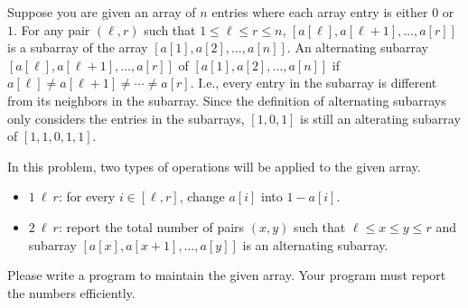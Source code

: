 Suppose you are given an array of $n$ entries
where each array entry is either $0$ or $1$.
For any pair $(\ell,r)$ such that $1\le \ell \le r\le n$, 
$[a[\ell],a[\ell+1],\dots,a[r]]$ is a subarray of the array
$[a[1], a[2], \dots, a[n]]$.
An alternating subarray $[a[\ell],a[\ell+1],\dots,a[r]]$ of 
$[a[1], a[2], \dots, a[n]]$
if $a[\ell]\neq a[\ell+1]\neq \cdots \neq a[r]$. I.e., every entry
in the subarray is different from its neighbors in the subarray.
Since the definition of alternating subarrays only considers the entries in
the subarrays, $[1,0,1]$ is still an alterating subarray of $[1,1,0,1,1]$.

In this problem, two types of operations will be applied to the given array.
\begin{itemize}
\item $1~\ell~r$: for every $i\in[\ell,r]$, change $a[i]$ into $1-a[i]$.
\item $2~\ell~r$: report the total number of pairs $(x, y)$ such that 
$\ell \leq x \leq y \leq r$ and subarray 
$[a[x],a[x+1],\dots,a[y]]$ is an alternating subarray.
\end{itemize}

Please write a program to maintain the given array.
Your program must report the numbers efficiently.

